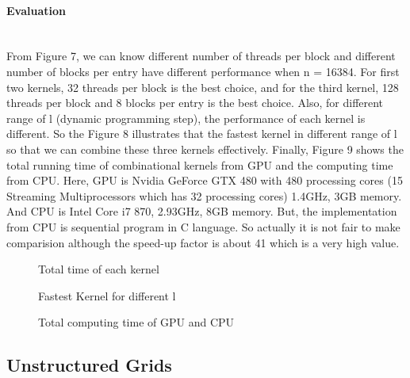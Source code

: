 \documentclass[11pt]{article}
\begin{document}
		\paragraph{Evaluation}
\hfill \\

From Figure 7, we can know different number of threads per block and different number of blocks per entry have different performance when n = 16384. For first two kernels, 32 threads per block is the best choice, and for the third kernel, 128 threads per block and 8 blocks per entry is the best choice. Also, for different range of l (dynamic programming step), the performance of each kernel is different. So the Figure 8 illustrates that the fastest kernel in different range of l so that we can combine these three kernels effectively. Finally, Figure 9 shows the total running time of combinational kernels from GPU and the computing time from CPU. Here, GPU is Nvidia GeForce GTX 480 with 480 processing cores (15 Streaming Multiprocessors which has 32 processing cores) 1.4GHz, 3GB memory. And CPU is Intel Core i7 870, 2.93GHz, 8GB memory. But, the implementation from CPU is sequential program in C language. So actually it is not fair to make comparision although the speed-up factor is about 41 which is a very high value. 
\\

\begin{figure}[H]
\centering
\begin{minipage}{.3\textwidth}
  \centering
	\fbox{\texttt{[image: dp8]} } 
	\label{table:dp8}
	\caption{Total time of each kernel ~\cite{DP}}
\end{minipage}%
\begin{minipage}{.3\textwidth}
  \centering
	\fbox{\texttt{[image: dp9]} } 
	\label{table:dp9}
	\caption{Fastest Kernel for different l ~\cite{DP}}
\end{minipage}%
\begin{minipage}{.3\textwidth}
  \centering
	\fbox{\texttt{[image: dp10]} } 
	\label{table:dp10}
	\caption{Total computing time of GPU and CPU ~\cite{DP}}
\end{minipage}%
\end{figure}

	\subsection{Unstructured Grids}
	
\end{document}
